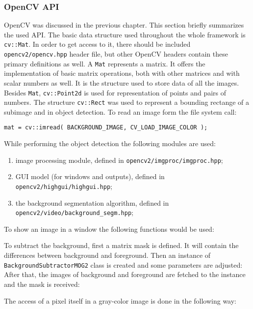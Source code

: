     \subsubsection{OpenCV API}

        OpenCV was discussed in the previous chapter. This section briefly summarizes the used API. 
        The basic data structure used throughout the whole framework is \verb|cv::Mat|. In order to get access to it, there should be included \verb|opencv2/opencv.hpp| header file, but other OpenCV headers contain these primary definitions as well. A \verb|Mat| represents a matrix. It offers the implementation of basic matrix operations, both with other matrices and with scalar numbers as well. It is the structure used to store data of all the images. Besides \verb|Mat|, \verb|cv::Point2d| is used for representation of points and pairs of numbers. The structure \verb|cv::Rect| was used to represent a bounding rectange of a subimage and in object detection. To read an image form the file system call: 



        \verb|mat = cv::imread( BACKGROUND_IMAGE, CV_LOAD_IMAGE_COLOR );|

         \noindent While performing the object detection the following modules are used: 
        \begin{enumerate}[topsep=5pt, partopsep=0pt,itemsep=3pt,parsep=1pt]
            \item image processing module, defined in     \verb|opencv2/imgproc/imgproc.hpp|;
            \item GUI model (for windows and outputs),
            defined in \verb|opencv2/highgui/highgui.hpp|;
            \item the background segmentation algorithm,
            defined in \verb|opencv2/video/background_segm.hpp|;
        \end{enumerate}\itemsep0pt

        To show an image in a window the following functions would be used:
        
\vspace{5mm}
        To subtract the background, first a matrix mask is defined. It will contain the differences between background and foreground. Then an instance of \verb|BackgroundSubtractorMOG2| class is created and some parameters are adjusted: After that, the images of background and foreground are fetched to the instance and the mask is received:
        
\vspace{5mm}
        The access of a pixel itself in a gray-color image is done in the following way:


